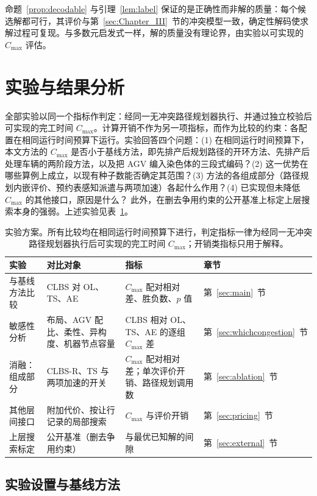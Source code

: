 \documentclass[manuscript,screen,review]{acmart}
\begin{document}
命题~\ref{prop:decodable} 与引理~\ref{lem:label} 保证的是正确性而非解的质量：每个候选解都可行，其评价与第~\ref{sec:Chapter_III}~节的冲突模型一致，确定性解码使求解过程可复现。与多数元启发式一样，解的质量没有理论界，由实验以可实现的 $C_{\max}$ 评估。

\section{实验与结果分析}
\label{sec:Chapter_V}

全部实验以同一个指标作判定：经同一无冲突路径规划器执行、并通过独立校验后可实现的完工时间 $C_{\max}$。计算开销不作为另一项指标，而作为比较的约束：各配置在相同运行时间预算下运行。实验回答四个问题：(1) 在相同运行时间预算下，本文方法的 $C_{\max}$ 是否小于基线方法，即先排产后规划路径的开环方法、先排产后处理车辆的两阶段方法，以及把 AGV 编入染色体的三段式编码？(2) 这一优势在哪些算例上成立，以现有种子数能否确定其范围？(3) 方法的各组成部分（路径规划内嵌评价、预约表感知派遣与两项加速）各起什么作用？(4) 已实现但未降低 $C_{\max}$ 的其他接口，原因是什么？
此外，在删去争用约束的公开基准上标定上层搜索本身的强弱。上述实验见表~\ref{tab:plan}。

\begin{table}[t]
\caption{实验方案。所有比较均在相同运行时间预算下进行，判定指标一律为经同一无冲突路径规划器执行后可实现的完工时间 $C_{\max}$；开销类指标只用于解释。}
\label{tab:plan}
\footnotesize
\begin{tabular}{@{}p{2.2cm}p{3.6cm}p{3.6cm}p{1.6cm}@{}}
\toprule
实验 & 对比对象 & 指标 & 章节 \\
\midrule
与基线方法比较 & CLBS 对 OL、TS、AE & $C_{\max}$ 配对相对差、胜负数、$p$ 值 & 第~\ref{sec:main}~节 \\
敏感性分析 & 布局、AGV 配比、柔性、异构度、机器节点容量 & CLBS 相对 OL、TS、AE 的逐组 $C_{\max}$ 差 & 第~\ref{sec:whichcongestion}~节 \\
消融：组成部分 & CLBS-R、TS 与两项加速的开关 & $C_{\max}$ 配对相对差；单次评价开销、路径规划调用数 & 第~\ref{sec:ablation}~节 \\
其他层间接口 & 附加代价、按让行记录的局部搜索 & $C_{\max}$ 与评价开销 & 第~\ref{sec:pricing}~节 \\
上层搜索标定 & 公开基准（删去争用约束） & 与最优已知解的间隙 & 第~\ref{sec:external}~节 \\
\bottomrule
\end{tabular}
\end{table}

\subsection{实验设置与基线方法}
\label{sec:instances}
\end{document}
